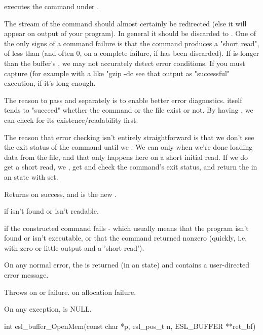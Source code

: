 \begin{sreapi}
 executes the command under .

The  stream of the command should almost
certainly be redirected (else it will appear on output
of your program). In general it should be discarded
to . One of the only signs of a command
failure is that the command produces a "short read", of
less than  (and often 0, on a complete
failure, if  has been discarded).  If 
is longer than the buffer's , we may not
accurately detect error conditions. If you must capture
 (for example with a  like
"gzip -dc %
see that output as "successful" execution, if it's long
enough.

The reason to pass  and  separately is
to enable better error diagnostics.  itself
tends to "succeed" whether the command or the file exist
or not.  By having , we can check for its
existence/readability first.

The reason that error checking  isn't entirely
straightforward is that we don't see the exit status of
the command until we . We can only 
when we're done loading data from the file, and that
only happens here on a short initial read. If we do get
a short read, we , get and check the command's
exit status, and return the  in an
 state with  set.

Returns  on success, and  is the new .

 if  isn't found or isn't readable.

 if the constructed command fails - which
usually means that the program isn't found or isn't
executable, or that the command returned nonzero
(quickly, i.e. with zero or little output and a 'short
read').

On any normal error, the  is returned (in an
 state) and  contains a
user-directed error message.

Throws  on  or  failure.
 on allocation failure.

On any exception,  is NULL.


\hypertarget{func:esl_buffer_OpenMem()}
{\item[int esl\_buffer\_OpenMem(const char *p, esl\_pos\_t n, ESL\_BUFFER **ret\_bf)]}


\end{sreapi}
